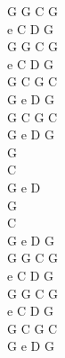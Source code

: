 \documentclass[a5paper, 10pt]{book}
\begin{document}
\begin{minipage}[t]{0.2\textwidth}
  G G C G \\
  e C D G\\
  G G C G \\
  e C D G\\
  G C G C\\
  G e D G\\
  G C G C\\
  G e D G\\

  G\\
  C\\
  G e D\\
  G\\
  C\\
  G e D G\\

  G G C G \\
  e C D G\\
  G G C G \\
  e C D G\\
  G C G C\\
  G e D G\\
\end{minipage}

\end{document}
